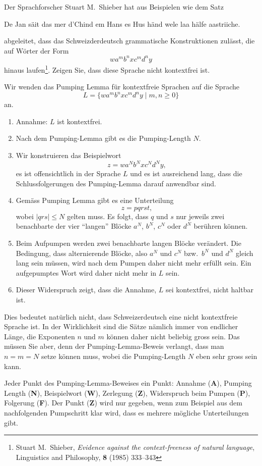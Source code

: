 Der Sprachforscher Stuart M.~Shieber hat aus Beispielen wie dem Satz
\begin{center}
De Jan säit das mer d'Chind em Hans es Hus händ wele laa hälfe aastriiche.
\end{center}
abgeleitet, dass das Schweizderdeutsch grammatische Konstruktionen
zulässt, die auf Wörter der Form
\[
wa^mb^nxc^md^ny
\]
hinaus laufen\footnote{Stuart M.~Shieber,
{\em Evidence against the context-freeness of natural language},
Linguistics and Philosophy, {\bf 8} (1985) 333--343}.
Zeigen Sie, dass diese Sprache nicht kontextfrei ist.

\begin{loesung}
Wir wenden das Pumping Lemma für kontextfreie Sprachen auf die Sprache
\[
L=\{
wa^mb^nxc^md^ny
\;|\; m,n\ge 0
\}
\]
an.
\begin{enumerate}
\item Annahme: $L$ ist kontextfrei.
\item Nach dem Pumping-Lemma gibt es die Pumping-Length $N$.
\item Wir konstruieren das Beispielwort
\[
z=wa^Nb^Nxc^Nd^Ny,
\]
es ist offensichtlich in der Sprache $L$
und es ist ausreichend lang, dass die Schlussfolgerungen des Pumping-Lemma
darauf anwendbar sind.
\item
Gemäss Pumping Lemma gibt es eine Unterteilung
\[
z=pqrst,
\]
wobei $|qrs|\le N$ gelten muss.
Es folgt, dass $q$ und $s$ nur jeweils zwei benachbarte der
vier ``langen'' Blöcke $a^N$, $b^N$, $c^N$ oder $d^N$ berühren können.
\item 
Beim Aufpumpen werden zwei benachbarte langen Blöcke verändert.
Die Bedingung, dass alternierende Blöcke, also $a^N$ und $c^N$
bzw.~$b^N$ und $d^N$ gleich lang sein müssen, wird nach dem Pumpen
daher nicht mehr erfüllt sein.
Ein aufgepumptes Wort wird daher nicht mehr in $L$ sein.
\item Dieser Widerspruch zeigt, dass die Annahme, $L$ sei kontextfrei,
nicht haltbar ist.
\qedhere
\end{enumerate}
\end{loesung}

\begin{diskussion}
Dies bedeutet natürlich nicht, dass Schweizerdeutsch eine nicht
kontextfreie Sprache ist.
In der Wirklichkeit sind die Sätze nämlich immer von endlicher Länge,
die Exponenten $n$ und $m$ können daher nicht beliebig gross sein.
Das müssen Sie aber, denn der Pumping-Lemma-Beweis verlangt, dass man
$n=m=N$ setze können muss, wobei die Pumping-Length $N$ eben sehr gross
sein kann.
\end{diskussion}

\begin{bewertung}
Jeder Punkt des Pumping-Lemma-Beweises ein Punkt:
Annahme ({\bf A}), Pumping Length ({\bf N}), Beispielwort ({\bf W}),
Zerlegung ({\bf Z}), Widerspruch beim Pumpen ({\bf P}), 
Folgerung ({\bf F}).
Der Punkt ({\bf Z}) wird nur gegeben, wenn zum Beispiel aus dem nachfolgenden
Pumpschritt klar wird, dass es mehrere mögliche Unterteilungen gibt.
\end{bewertung}

